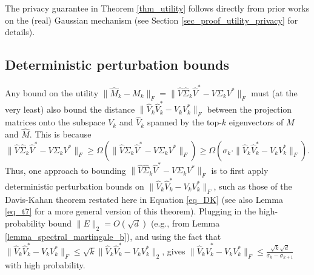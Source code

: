 \documentclass[11pt,letterpaper]{article}
\begin{document}
The privacy guarantee in Theorem \ref{thm_utility} follows directly from prior works on the (real) Gaussian mechanism (see Section \ref{sec_proof_utility_privacy} for details).

\subsection{Deterministic perturbation bounds}\label{sec_deterministic_perturbation_bounds}

Any bound on the utility $\|\hat{M}_k - M_k\|_F = \|\hat{V} \hat{\Sigma}_k \hat{V}^\ast - V \Sigma_k V^\ast\|_F$ must (at the very least) also bound the distance $\|\hat{V}_k \hat{V}_k^\ast - V_k V_k^\ast\|_F$ between the projection matrices onto the subspace $V_k$ and $\hat{V}_k$ spanned by the top-$k$ eigenvectors of $M$ and $\hat{M}$.
%
This is because 
$$\|\hat{V} \hat{\Sigma}_k \hat{V}^\ast - V \Sigma_k V^\ast\|_F \geq \Omega(\|\hat{V} \Sigma_k \hat{V}^\ast - V \Sigma_k V^\ast\|_F) \geq \Omega(\sigma_{k} \cdot \|\hat{V}_k \hat{V}_k^\ast - V_k V_k^\ast\|_F).$$
%
Thus, one approach to bounding $\|\hat{V} \hat{\Sigma}_k \hat{V}^\ast - V \Sigma_k V^\ast\|_F$ is to first apply deterministic perturbation bounds on $\|\hat{V}_k \hat{V}_k^\ast - V_k V_k^\ast\|_F$, such as those of the Davis-Kahan theorem \cite{davis1970rotation} restated here in Equation \eqref{eq_DK} (see also Lemma \ref{eq_t7} for a more general version of this theorem).
%
 Plugging in the high-probability bound  $\|E\|_2 = O(\sqrt{d})$ (e.g., from Lemma \ref{lemma_spectral_martingale_b}), and using the fact that $\|\hat{V}_k \hat{V}_k^\ast - V_k V_k^\ast\|_F \leq \sqrt{k} \|\hat{V}_k \hat{V}_k^\ast - V_k V_k^\ast\|_2$, gives $\|\hat{V}_k \hat{V}_k^\ast - V_k V_k^\ast\|_F \leq \frac{\sqrt{k} \sqrt{d}}{\sigma_k - \sigma_{k+1}}$ with high probability.
\end{document}
